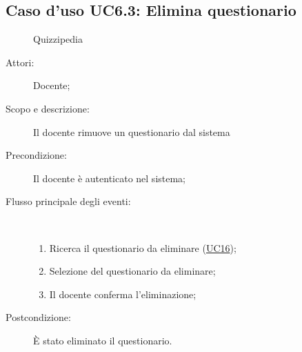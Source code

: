 \subsection{Caso d'uso UC6.3: Elimina questionario}
	\begin{figure}[H]
		\centering
		\begin{resizedtikzpicture}{\textwidth}
		\begin{umlsystem}[x=0, fill=lightgray!20]{Quizzipedia}
		\end{umlsystem}
		\end{resizedtikzpicture}
		\caption{}
	\end{figure}
\begin{description}
\item[Attori:] Docente;
\item[Scopo e descrizione:] Il docente rimuove un questionario dal sistema
      \item[Precondizione:] Il docente è autenticato nel sistema;

        \item[Flusso principale degli eventi:] \ 
 \begin{enumerate}
          \item Ricerca il questionario da eliminare (\hyperlink{UC16}{UC16});
          \item Selezione del questionario da eliminare;
          \item Il docente conferma l'eliminazione;

      \end{enumerate}
    \item[Postcondizione:] È stato eliminato il questionario.
  \end{description}
\hypertarget{UC6.4}{}
